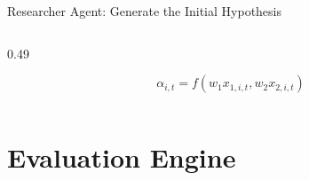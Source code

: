 \documentclass[10pt,aspectratio=169]{beamer}
\begin{document}
\begin{frame}{Researcher Agent: Generate the Initial Hypothesis}
\begin{columns}[T,onlytextwidth]
\begin{column}{0.49\textwidth}
\vspace{0.1cm}

\[
\alpha_{i,t}
=
f\!\left(
w_1 x_{1,i,t},
w_2 x_{2,i,t}
\right)
\]

\vspace{0.15cm}

\end{column}

\end{columns}

\vspace{0.15cm}


\end{frame}

\section{Evaluation Engine}
\end{document}
